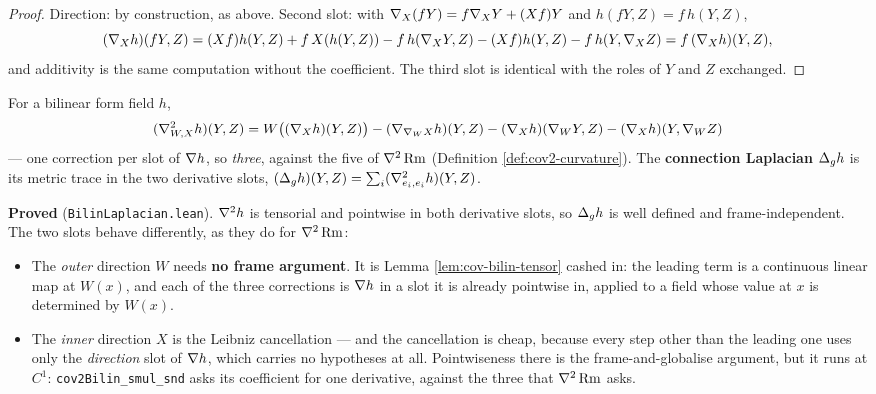 \begin{proof}
  \leanok
  Direction: by construction, as above. Second slot: with
  $\nabla_X(fY) = f\nabla_X Y + (Xf) Y$ and $h(fY,Z) = f\,h(Y,Z)$,
  \[
    (\nabla_X h)(fY,Z) = (Xf)h(Y,Z) + f\,X(h(Y,Z)) - f\,h(\nabla_XY,Z)
      - (Xf)h(Y,Z) - f\,h(Y,\nabla_XZ) = f\,(\nabla_X h)(Y,Z),
  \]
  and additivity is the same computation without the coefficient. The third
  slot is identical with the roles of $Y$ and $Z$ exchanged.
\end{proof}

\begin{definition}
  \label{def:bilin-laplacian}
  \leanok
  For a bilinear form field $h$,
  \[
    (\nabla^2_{W,X} h)(Y,Z) = W\big((\nabla_X h)(Y,Z)\big) - (\nabla_{\nabla_W X} h)(Y,Z)
      - (\nabla_X h)(\nabla_W Y, Z) - (\nabla_X h)(Y, \nabla_W Z)
  \]
  --- one correction per slot of $\nabla h$, so \emph{three}, against the five of
  $\nabla^2\operatorname{Rm}$ (Definition \ref{def:cov2-curvature}). The \textbf{connection
  Laplacian} $\Delta_g h$ is its metric trace in the two derivative slots,
  $(\Delta_g h)(Y,Z) = \sum_i (\nabla^2_{e_i,e_i} h)(Y,Z)$.

  \textbf{Proved} (\texttt{BilinLaplacian.lean}). $\nabla^2 h$ is tensorial and
  pointwise in both derivative slots, so $\Delta_g h$ is well defined and
  frame-independent. The two slots behave differently, as they do for
  $\nabla^2\operatorname{Rm}$:

  \begin{itemize}
    \item The \emph{outer} direction $W$ needs \textbf{no frame argument}. It is
      Lemma \ref{lem:cov-bilin-tensor} cashed in: the leading term is a
      continuous linear map at $W(x)$, and each of the three corrections is
      $\nabla h$ in a slot it is already pointwise in, applied to a field whose
      value at $x$ is determined by $W(x)$.
    \item The \emph{inner} direction $X$ is the Leibniz cancellation --- and the
      cancellation is cheap, because every step other than the leading one uses
      only the \emph{direction} slot of $\nabla h$, which carries no hypotheses at
      all. Pointwiseness there is the frame-and-globalise argument, but it runs
      at $C^1$: \texttt{cov2Bilin\_smul\_snd} asks its coefficient for one
      derivative, against the three that $\nabla^2\operatorname{Rm}$ asks.
  \end{itemize}


\end{definition}
